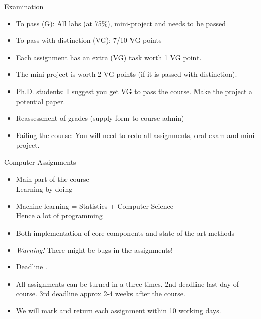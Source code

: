 \documentclass[10pt]{beamer}
\begin{document}
\begin{frame}{Examination}

\begin{itemize}
\item To pass (G): All labs (at 75\%), mini-project and  needs to be passed\pause
\item To pass with distinction (VG): 7/10 VG points\pause
\item Each assignment has an extra (VG) task worth 1 VG point.\pause
\item The mini-project is worth 2 VG-points (if it is passed with distinction).
\item Ph.D. students: I suggest you get VG to pass the course. Make the project a potential paper.
\item Reassessment of grades (supply form to course admin)
\item Failing the course: You will need to redo all assignments, oral exam and mini-project.
\end{itemize}

\end{frame}


\begin{frame}{Computer Assignments}

\begin{itemize}
\item Main part of the course\\Learning by doing
\item Machine learning = Statistics + Computer Science\\Hence a lot of programming\pause
\item Both implementation of core components and state-of-the-art methods\pause
\item \emph{Warning!} There might be bugs in the assignments! \pause
\item Deadline .\pause
\item All assignments can be turned in a three times. 2nd deadline last day of course. 3rd deadline approx 2-4 weeks after the course. \pause
\item We will mark and return each assignment within 10 working days.
\end{itemize}
\end{frame}
\end{document}
